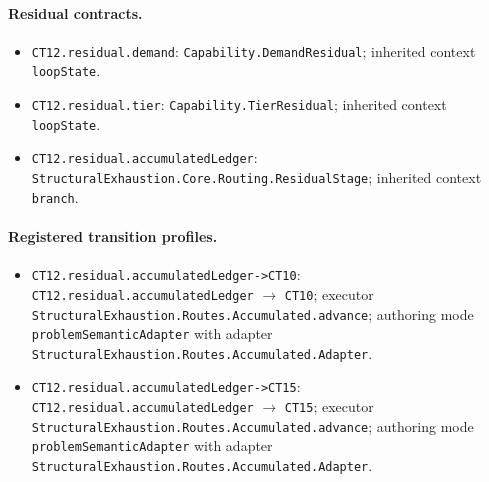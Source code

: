\paragraph{Residual contracts.}
\begin{itemize}
\item \texttt{CT12.\allowbreak{}residual.\allowbreak{}demand}: \texttt{Capability.\allowbreak{}Demand\allowbreak{}Residual}; inherited context \texttt{loop\allowbreak{}State}.
\item \texttt{CT12.\allowbreak{}residual.\allowbreak{}tier}: \texttt{Capability.\allowbreak{}Tier\allowbreak{}Residual}; inherited context \texttt{loop\allowbreak{}State}.
\item \texttt{CT12.\allowbreak{}residual.\allowbreak{}accumulated\allowbreak{}Ledger}: \texttt{Structural\allowbreak{}Exhaustion.\allowbreak{}Core.\allowbreak{}Routing.\allowbreak{}Residual\allowbreak{}Stage}; inherited context \texttt{branch}.
\end{itemize}
\paragraph{Registered transition profiles.}
\begin{itemize}
\item \texttt{CT12.\allowbreak{}residual.\allowbreak{}accumulated\allowbreak{}Ledger-\allowbreak{}>CT10}: \texttt{CT12.\allowbreak{}residual.\allowbreak{}accumulated\allowbreak{}Ledger} $\to$ \texttt{CT10}; executor \texttt{Structural\allowbreak{}Exhaustion.\allowbreak{}Routes.\allowbreak{}Accumulated.\allowbreak{}advance}; authoring mode \texttt{problem\allowbreak{}Semantic\allowbreak{}Adapter} with adapter \texttt{Structural\allowbreak{}Exhaustion.\allowbreak{}Routes.\allowbreak{}Accumulated.\allowbreak{}Adapter}.
\item \texttt{CT12.\allowbreak{}residual.\allowbreak{}accumulated\allowbreak{}Ledger-\allowbreak{}>CT15}: \texttt{CT12.\allowbreak{}residual.\allowbreak{}accumulated\allowbreak{}Ledger} $\to$ \texttt{CT15}; executor \texttt{Structural\allowbreak{}Exhaustion.\allowbreak{}Routes.\allowbreak{}Accumulated.\allowbreak{}advance}; authoring mode \texttt{problem\allowbreak{}Semantic\allowbreak{}Adapter} with adapter \texttt{Structural\allowbreak{}Exhaustion.\allowbreak{}Routes.\allowbreak{}Accumulated.\allowbreak{}Adapter}.
\end{itemize}
\endgroup
